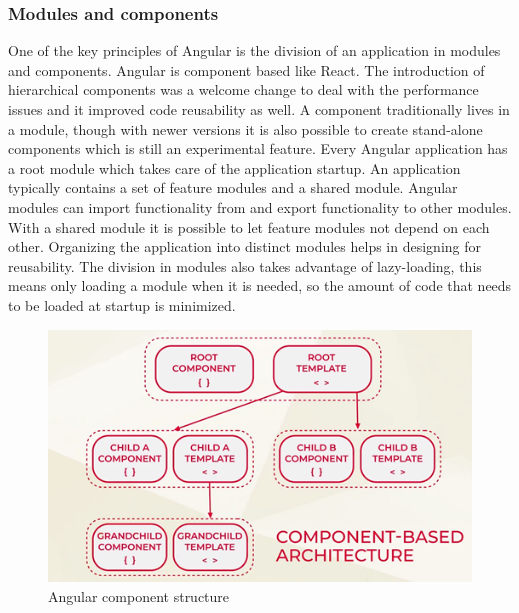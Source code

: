 \subsubsection{Modules and components}
One of the key principles of Angular is the division of an application in modules and components.
Angular is component based like React. The introduction of hierarchical components was a welcome change to deal with the performance issues and it improved code reusability as well. A component traditionally lives in a module, though with newer versions it is also possible to create stand-alone components which is still an experimental feature.
Every Angular application has a root module which takes care of the application startup. An application typically contains a set of feature modules and a shared module. Angular modules can import functionality from and export functionality to other modules. With a shared module it is possible to let feature modules not depend on each other. Organizing the application into distinct modules helps in designing for reusability. The division in modules also takes advantage of lazy-loading, this means only loading a module when it is needed, so the amount of code that needs to be loaded at startup is minimized. 
\autocite{Angular.io}

\begin{figure}[h!]
    \caption{Angular component structure}
    \centering
    \includegraphics[width=\textwidth]{img/angularcomponent.png} 
\end{figure}

